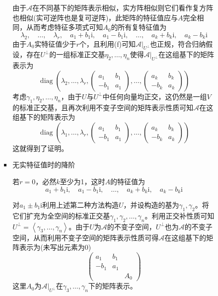 \documentclass[a4paper,UTF8,fontset=windows,AutoFakeBold]{ctexart}
\DeclareMathOperator{\diag}{diag}
\newcommand*{\ir}{\mathrm{i}}
\newcommand*{\ma}{\mathcal{A}}
\begin{document}
\begin{enumerate}
\begin{enumerate}
\begin{itemize}
\begin{itemize}
                由于$\ma$在不同基下的矩阵表示相似，实方阵相似则它们看作复方阵也相似(实可逆阵也是复可逆阵)，此矩阵的特征值应与$A$完全相同，从而考虑特征多项式可知$A_0$的所有复特征值为
                $$\lambda_2,\quad\dots,\quad\lambda_r,\quad a_1+b_1\ir,\quad a_1-b_1\ir,\quad\dots,\quad a_k+b_k\ir,\quad a_k-b_k\ir$$
                由于$A_0$实特征值少于$r$个，且利用(f)可知$\ma|_{U^\bot}$也正规，符合归纳假设，存在$U^\bot$的一组标准正交基$\eta_2,\dots,\eta_n$使得$\ma|_{U^\bot}$在这组基下的矩阵表示为
                $$\diag\left(\lambda_2,\dots,\lambda_r,\begin{pmatrix}a_1&b_1\\-b_1&a_1\end{pmatrix},\dots,\begin{pmatrix}a_k&b_k\\-b_k&a_k\end{pmatrix}\right)$$
                考虑$\gamma_1,\eta_2,\dots,\eta_n$，由于$U$与$U^\bot$中任何向量均正交，这仍然是一组$V$的标准正交基，且再次利用不变子空间的矩阵表示性质可知$\ma$在这组基下的矩阵表示为
                $$\diag\left(\lambda_1,\dots,\lambda_r,\begin{pmatrix}a_1&b_1\\-b_1&a_1\end{pmatrix},\dots,\begin{pmatrix}a_k&b_k\\-b_k&a_k\end{pmatrix}\right)$$
                这就得到了证明。

                \item 无实特征值时的降阶
                
                若$r=0$，必然$k$至少为1，这时$A$的特征值为
                $$a_1+b_1\ir,\quad a_1-b_1\ir,\quad\dots,\quad a_k+b_k\ir,\quad a_k-b_k\ir$$
                
                对$a_1\pm b_1\ir$利用上述第二种方法构造$U$，并设构造的基为$\gamma_1,\gamma_2$。将它们扩充为全空间的标准正交基$\gamma_1,\gamma_2,\dots,\gamma_n$。利用正交补性质可知$U^\bot=\left<\gamma_3,\dots,\gamma_n\right>$。由于$U$为$\ma$的不变子空间，$U^\bot$也为$\ma$的不变子空间，从而利用不变子空间的矩阵表示性质可得$\ma$在这组基下的矩阵表示为(未写出元素为0)
                $$\begin{pmatrix}a_1&b_1\\-b_1&a_1\\ &&A_0\end{pmatrix}$$
                这里$A_0$为$\ma|_{U^\bot}$在$\gamma_3,\dots,\gamma_n$下的矩阵表示。


\end{itemize}
\end{itemize}
\end{enumerate}
\end{enumerate}
\end{document}

